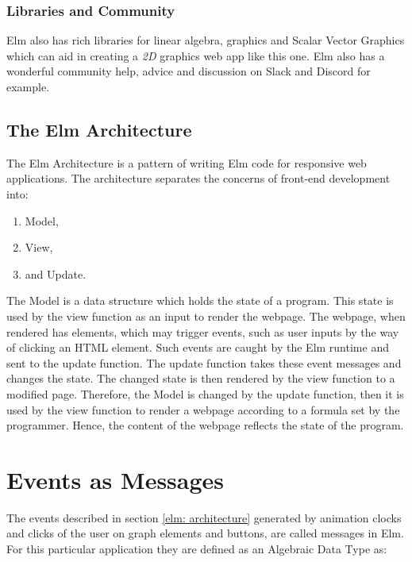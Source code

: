 \subsubsection{Libraries and Community}
Elm also has rich libraries for linear algebra, graphics and Scalar Vector
Graphics which can aid in creating a \emph{2D} graphics web app like this one.
Elm also has a wonderful community help, advice and discussion on Slack and
Discord for example.

\subsection{The Elm Architecture}
\label{elm: architecture}
The Elm Architecture is a pattern of writing Elm code for responsive web
applications.  The architecture separates the concerns of front-end development
into:

\begin{enumerate}
\item Model,
\item View,
\item and Update.
\end{enumerate}

The Model is a data structure which holds the state of a program.
\cite{Fairbank19} This state is used by the view function as an input to
render the webpage.  The webpage, when rendered has elements, which may trigger
events, such as user inputs by the way of clicking an HTML element. Such events
are caught by the Elm runtime and sent to the update function.  The update
function takes these event messages and changes the state. The changed state is
then rendered by the view function to a modified page.  Therefore, the Model is
changed by the update function, then it is used by the view function to
render a webpage according to a formula set by the programmer. Hence, the content
of the webpage reflects the state of the program.


\section{Events as Messages}
\label{impl: messages}
The events described in section \autoref{elm: architecture} generated by
animation clocks and clicks of the user on graph elements and buttons, are
called messages in Elm. For this particular
application they are defined as an Algebraic Data Type as:

